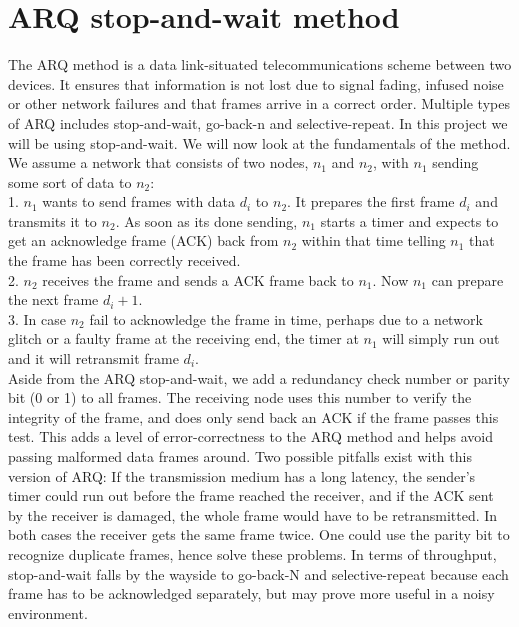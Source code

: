 \section{ARQ stop-and-wait method}\label{th:arq}

The ARQ method is a data link-situated telecommunications scheme between two devices. It ensures that information is not lost due to signal fading, infused noise or other network failures and that frames arrive in a correct order. Multiple types of ARQ includes stop-and-wait, go-back-n and selective-repeat. In this project we will be using stop-and-wait. We will now look at the fundamentals of the method. We assume a network that consists of two nodes, $n_1$ and $n_2$, with $n_1$ sending some sort of data to $n_2$: \newline \\
1. $n_1$ wants to send frames with data $d_i$ to $n_2$. It prepares the first frame $d_i$ and transmits it to $n_2$. As soon as its done sending, $n_1$ starts a timer and expects to get an acknowledge frame (ACK) back from $n_2$ within that time telling $n_1$ that the frame has been correctly received. \newline \\
2. $n_2$ receives the frame and sends a ACK frame back to $n_1$. Now $n_1$ can prepare the next frame $d_i+1$. \newline \\
3. In case $n_2$ fail to acknowledge the frame in time, perhaps due to a network glitch or a faulty frame at the receiving end, the timer at $n_1$ will simply run out and it will retransmit frame $d_i$. \newline \\
\noindent Aside from the ARQ stop-and-wait, we add a redundancy check number or parity bit (0 or 1) to all frames. The receiving node uses this number to verify the integrity of the frame, and does only send back an ACK if the frame passes this test. This adds a level of error-correctness to the ARQ method and helps avoid passing malformed data frames around. Two possible pitfalls exist with this version of ARQ: If the transmission medium has a long latency, the sender's timer could run out before the frame reached the receiver, and if the ACK sent by the receiver is damaged, the whole frame would have to be retransmitted. In both cases the receiver gets the same frame twice. One could use the parity bit to recognize duplicate frames, hence solve these problems. In terms of throughput, stop-and-wait falls by the wayside to go-back-N and selective-repeat because each frame has to be acknowledged separately, but may prove more useful in a noisy environment.
